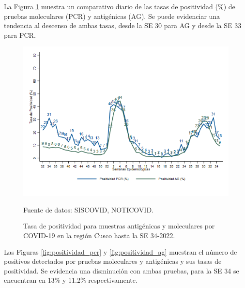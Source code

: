 \documentclass[12pt,a4paper,openany]{book}
\begin{document}
	\pagebreak
	
	
	La Figura \ref{fig:total_muestras_procesada} muestra un comparativo diario de las tasas de positividad ($\%$) de pruebas moleculares (PCR) y antigénicas (AG). Se puede evidenciar una tendencia al descenso de ambas tasas, desde la SE 30 para AG y desde la SE 33 para PCR.
	
	\begin{figure}[h]
		\caption{Tasa de positividad para muestras antigénicas y moleculares por COVID-19 en la región Cusco hasta la SE 34-2022. }\label{fig:total_muestras_procesada}
		\begin{center}
			\includegraphics[width=0.80\linewidth]{../figuras/positividad_diaria_2021_2022.png}
		\end{center}
		{\footnotesize {Fuente de datos: SISCOVID, NOTICOVID.}}
	\end{figure}
	
	
	
	Las Figuras \ref{fig:positividad_pcr} y \ref{fig:positividad_ag} muestran el número de positivos detectados por pruebas moleculares y antigénicas y sus tasas de positividad. Se evidencia una disminución con ambas pruebas, para la SE 34 se encuentran en 13$\%$ y 11.2$\%$ respectivamente.
	
\end{document}
